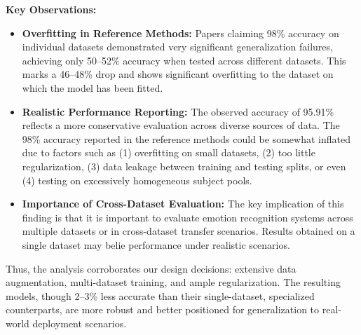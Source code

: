 \documentclass[conference]{IEEEtran}
\begin{document}
\textbf{Key Observations:}

\begin{itemize}
    \item \textbf{Overfitting in Reference Methods:} Papers claiming 98\% accuracy on individual datasets demonstrated very significant generalization failures, achieving only 50--52\% accuracy when tested across different datasets. This marks a 46--48\% drop and shows significant overfitting to the dataset on which the model has been fitted.
    
    \item \textbf{Realistic Performance Reporting:} The observed accuracy of 95.91\% reflects a more conservative evaluation across diverse sources of data. The 98\% accuracy reported in the reference methods could be somewhat inflated due to factors such as (1) overfitting on small datasets, (2) too little regularization, (3) data leakage between training and testing splits, or even (4) testing on excessively homogeneous subject pools.
    
    \item \textbf{Importance of Cross-Dataset Evaluation:} The key implication of this finding is that it is important to evaluate emotion recognition systems across multiple datasets or in cross-dataset transfer scenarios. Results obtained on a single dataset may belie performance under realistic scenarios.
\end{itemize}

Thus, the analysis corroborates our design decisions: extensive data augmentation, multi-dataset training, and ample regularization. The resulting models, though 2–3\% less accurate than their single-dataset, specialized counterparts, are more robust and better positioned for generalization to real-world deployment scenarios.


    
    
\end{document}

